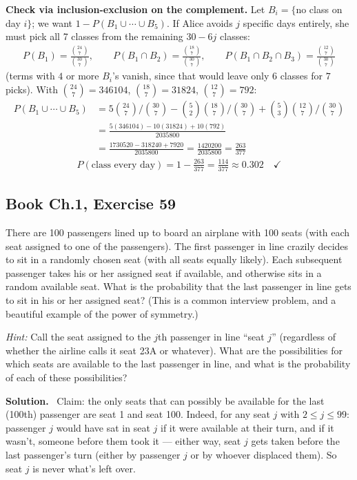 \documentclass[11pt]{article}
\newcommand{\Sol}{\vspace{2pt}\noindent\textbf{Solution.}\ }
\begin{document}
\textbf{Check via inclusion-exclusion on the complement.} Let $B_i=\{$no class on day $i\}$; we want $1-P(B_1\cup\cdots\cup B_5)$. If Alice avoids $j$ specific days entirely, she must pick all 7 classes from the remaining $30-6j$ classes:
\begin{align*}
P(B_1) = \frac{\binom{24}{7}}{\binom{30}{7}},\qquad P(B_1\cap B_2) = \frac{\binom{18}{7}}{\binom{30}{7}}, \qquad P(B_1\cap B_2\cap B_3) = \frac{\binom{12}{7}}{\binom{30}{7}}
\end{align*}
(terms with $4$ or more $B_i$'s vanish, since that would leave only $6$ classes for $7$ picks). With $\binom{24}{7}=346104$, $\binom{18}{7}=31824$, $\binom{12}{7}=792$:
\begin{align*}
P(B_1\cup\cdots\cup B_5) &= 5\binom{24}{7}\Big/\binom{30}{7} - \binom{5}{2}\binom{18}{7}\Big/\binom{30}{7} + \binom{5}{3}\binom{12}{7}\Big/\binom{30}{7}\\
&= \frac{5(346104) - 10(31824) + 10(792)}{2035800}\\
&= \frac{1730520 - 318240 + 7920}{2035800} = \frac{1420200}{2035800} = \frac{263}{377}
\end{align*}
\begin{align*}
P(\text{class every day}) = 1-\frac{263}{377} = \frac{114}{377} \approx 0.302 \quad\checkmark
\end{align*}

\subsection{Book Ch.1, Exercise 59}
\begin{qbox}
There are 100 passengers lined up to board an airplane with 100 seats (with each seat assigned to one of the passengers). The first passenger in line crazily decides to sit in a randomly chosen seat (with all seats equally likely). Each subsequent passenger takes his or her assigned seat if available, and otherwise sits in a random available seat. What is the probability that the last passenger in line gets to sit in his or her assigned seat? (This is a common interview problem, and a beautiful example of the power of symmetry.)

\emph{Hint:} Call the seat assigned to the $j$th passenger in line ``seat $j$'' (regardless of whether the airline calls it seat 23A or whatever). What are the possibilities for which seats are available to the last passenger in line, and what is the probability of each of these possibilities?
\end{qbox}
\Sol
Claim: the only seats that can possibly be available for the last (100th) passenger are seat 1 and seat 100. Indeed, for any seat $j$ with $2\le j\le 99$: passenger $j$ would have sat in seat $j$ if it were available at their turn, and if it wasn't, someone before them took it — either way, seat $j$ gets taken before the last passenger's turn (either by passenger $j$ or by whoever displaced them). So seat $j$ is never what's left over.
\end{document}

